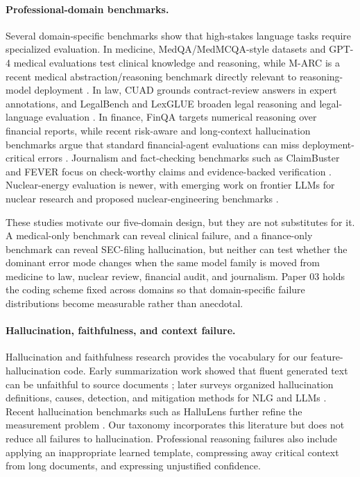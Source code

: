 \paragraph{Professional-domain benchmarks.}
Several domain-specific benchmarks show that high-stakes language tasks require specialized evaluation. In medicine, MedQA/MedMCQA-style datasets and GPT-4 medical evaluations test clinical knowledge and reasoning, while M-ARC is a recent medical abstraction/reasoning benchmark directly relevant to reasoning-model deployment \citep{jin2021diseaseqa,pal2022medmcqa,nori2023gpt4medicine,kim2025marc}. In law, CUAD grounds contract-review answers in expert annotations, and LegalBench and LexGLUE broaden legal reasoning and legal-language evaluation \citep{hendrycks2021cuad,guha2023legalbench,chalkidis2022lexglue}. In finance, FinQA targets numerical reasoning over financial reports, while recent risk-aware and long-context hallucination benchmarks argue that standard financial-agent evaluations can miss deployment-critical errors \citep{chen2021finqa,financebench2025risk,phantom2025finance}. Journalism and fact-checking benchmarks such as ClaimBuster and FEVER focus on check-worthy claims and evidence-backed verification \citep{hassan2017claimbuster,thorne2018fever}. Nuclear-energy evaluation is newer, with emerging work on frontier LLMs for nuclear research and proposed nuclear-engineering benchmarks \citep{almeldein2025nuclear,nucbench2026}.

These studies motivate our five-domain design, but they are not substitutes for it. A medical-only benchmark can reveal clinical failure, and a finance-only benchmark can reveal SEC-filing hallucination, but neither can test whether the dominant error mode changes when the same model family is moved from medicine to law, nuclear review, financial audit, and journalism. Paper 03 holds the coding scheme fixed across domains so that domain-specific failure distributions become measurable rather than anecdotal.

\paragraph{Hallucination, faithfulness, and context failure.}
Hallucination and faithfulness research provides the vocabulary for our feature-hallucination code. Early summarization work showed that fluent generated text can be unfaithful to source documents \citep{maynez2020faithfulness}; later surveys organized hallucination definitions, causes, detection, and mitigation methods for NLG and LLMs \citep{ji2023survey,huang2023hallucinationSurvey}. Recent hallucination benchmarks such as HalluLens further refine the measurement problem \citep{halluLens2025}. Our taxonomy incorporates this literature but does not reduce all failures to hallucination. Professional reasoning failures also include applying an inappropriate learned template, compressing away critical context from long documents, and expressing unjustified confidence.

